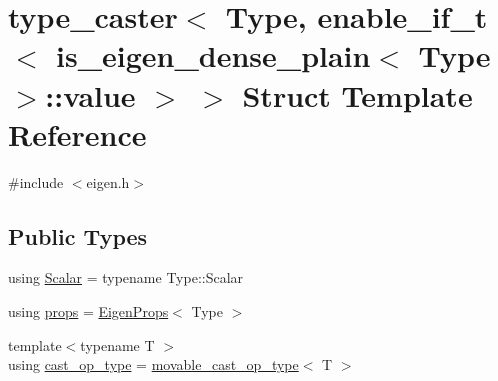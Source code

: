 \hypertarget{structtype__caster_3_01_type_00_01enable__if__t_3_01is__eigen__dense__plain_3_01_type_01_4_1_1value_01_4_01_4}{}\section{type\+\_\+caster$<$ Type, enable\+\_\+if\+\_\+t$<$ is\+\_\+eigen\+\_\+dense\+\_\+plain$<$ Type $>$\+::value $>$ $>$ Struct Template Reference}
\label{structtype__caster_3_01_type_00_01enable__if__t_3_01is__eigen__dense__plain_3_01_type_01_4_1_1value_01_4_01_4}


{\ttfamily \#include $<$eigen.\+h$>$}

\subsection*{Public Types}
\begin{DoxyCompactItemize}
\item 
using \mbox{\hyperlink{structtype__caster_3_01_type_00_01enable__if__t_3_01is__eigen__dense__plain_3_01_type_01_4_1_1value_01_4_01_4_ac0e9d7ef9b4e07d6d90d4a9093b3e939}{Scalar}} = typename Type\+::\+Scalar
\item 
using \mbox{\hyperlink{structtype__caster_3_01_type_00_01enable__if__t_3_01is__eigen__dense__plain_3_01_type_01_4_1_1value_01_4_01_4_a7d835d789bc39bd8960388ab9e098aed}{props}} = \mbox{\hyperlink{struct_eigen_props}{Eigen\+Props}}$<$ Type $>$
\item 
{\footnotesize template$<$typename T $>$ }\\using \mbox{\hyperlink{structtype__caster_3_01_type_00_01enable__if__t_3_01is__eigen__dense__plain_3_01_type_01_4_1_1value_01_4_01_4_a3155cecdaa64bdd698c332239d9af2e4}{cast\+\_\+op\+\_\+type}} = \mbox{\hyperlink{cast_8h_a32fe7f4c6e2ae670844b4f3ab92ba3b8}{movable\+\_\+cast\+\_\+op\+\_\+type}}$<$ T $>$
\end{DoxyCompactItemize}
